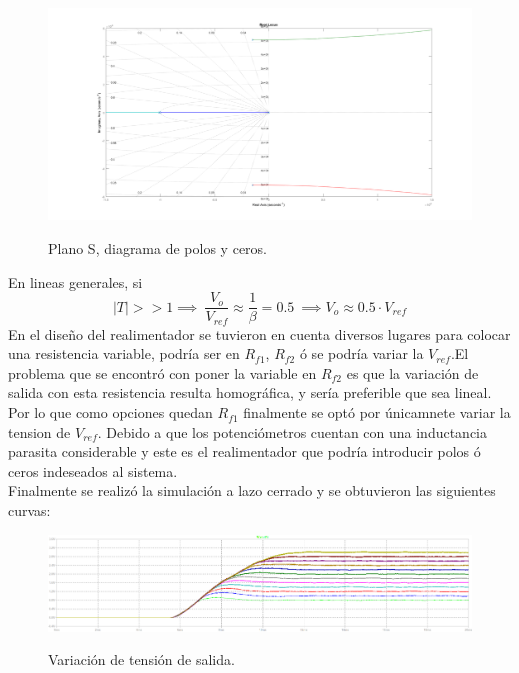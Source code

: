 \begin{figure}[H]
	\centering
	\includegraphics[width=0.9\linewidth]{ImagenesParteIII/Rlocus.png}
	\label{fig:zplane}
	\caption{Plano S, diagrama de polos y ceros.}
\end{figure}
En lineas generales, si 
\begin{equation}
|T| >> 1 \implies \ \frac{V_o}{V_{ref}} \approx \frac{1}{\beta} =  0.5 \ \implies V_o\approx 0.5 \cdot V_{ref} 
\end{equation}
En el diseño del realimentador se tuvieron en cuenta diversos lugares para colocar una resistencia variable, podría ser en $R_{f1}$, $R_{f2}$ ó se podría variar la $V_{ref}$.El problema que se encontró con poner la variable en $R_{f2}$ es que la variación de salida con esta resistencia resulta homográfica, y sería preferible que sea lineal. Por lo que como opciones quedan $R_{f1}$ finalmente se optó por únicamnete variar la tension de $V_{ref}$. Debido a que los potenciómetros cuentan con una inductancia parasita considerable y este es el realimentador que podría introducir polos ó ceros indeseados al sistema.\\ 
Finalmente se realizó la simulación a lazo cerrado y se obtuvieron las siguientes curvas:

\begin{figure}[H]
	\centering
	\includegraphics[width=0.9\linewidth]{ImagenesParteIII/Vouts.png}
	\label{fig:vouts_3}
	\caption{Variación de tensión de salida.}
\end{figure}
%